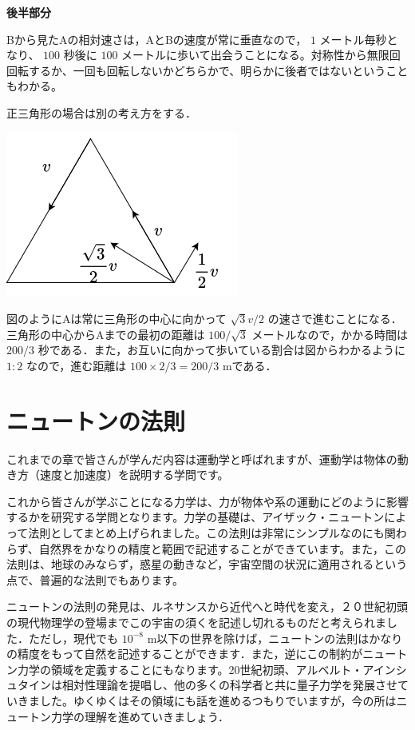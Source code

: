 \documentclass[
  b4paperpaper,
  xelatex,ja=standard]{bxjsbook}
\begin{document}
\textbf{後半部分}

Bから見たAの相対速さは，AとBの速度が常に垂直なので， \(1\)
メートル毎秒となり、 \(100\) 秒後に \(100\)
メートルに歩いて出会うことになる。対称性から無限回回転するか、一回も回転しないかどちらかで、明らかに後者ではないということもわかる。

正三角形の場合は別の考え方をする．

\includegraphics{source/images/velocity/mondai5.png}

図のようにAは常に三角形の中心に向かって \(\sqrt{3}v/2\)
の速さで進むことになる．三角形の中心からAまでの最初の距離は
\(100/\sqrt{3}\) メートルなので，かかる時間は \(200/3\)
秒である．また，お互いに向かって歩いている割合は図からわかるように
\(1:2\) なので，進む距離は \(100\times 2/3=200/3\) mである．


\hypertarget{ux30cbux30e5ux30fcux30c8ux30f3ux306eux6cd5ux5247}{%
\chapter{ニュートンの法則}\label{ux30cbux30e5ux30fcux30c8ux30f3ux306eux6cd5ux5247}}

これまでの章で皆さんが学んだ内容は運動学と呼ばれますが、運動学は物体の動き方（速度と加速度）を説明する学問です。

これから皆さんが学ぶことになる力学は、力が物体や系の運動にどのように影響するかを研究する学問となります。力学の基礎は、アイザック・ニュートンによって法則としてまとめ上げられました。この法則は非常にシンプルなのにも関わらず、自然界をかなりの精度と範囲で記述することができています。また，この法則は、地球のみならず，惑星の動きなど，宇宙空間の状況に適用されるという点で、普遍的な法則でもあります。

ニュートンの法則の発見は、ルネサンスから近代へと時代を変え，２０世紀初頭の現代物理学の登場までこの宇宙の須くを記述し切れるものだと考えられました．ただし，現代でも
\(10^{-8}\)
m以下の世界を除けば，ニュートンの法則はかなりの精度をもって自然を記述することができます．また，逆にこの制約がニュートン力学の領域を定義することにもなります。20世紀初頭、アルベルト・アインシュタインは相対性理論を提唱し、他の多くの科学者と共に量子力学を発展させていきました。ゆくゆくはその領域にも話を進めるつもりでいますが，今の所はニュートン力学の理解を進めていきましょう．
\end{document}

